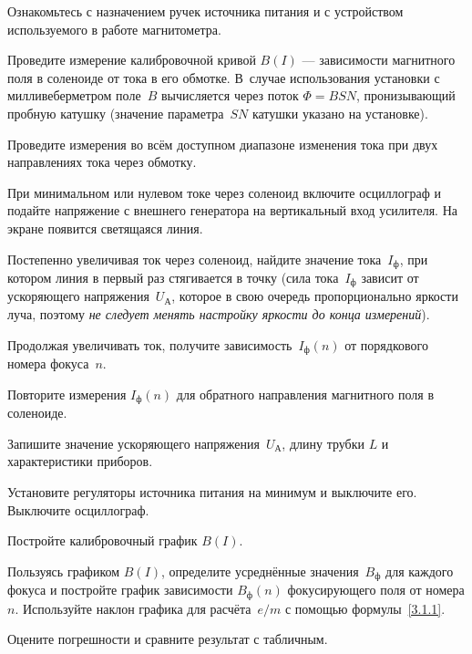 \begin{lab:task}

    
\item Ознакомьтесь с назначением ручек источника питания и с устройством 
    используемого в работе магнитометра. 
    
\item Проведите измерение калибровочной кривой $B(I)$ --- зависимости магнитного поля
в соленоиде от тока в его обмотке. В~случае использования установки с
милливеберметром поле~$B$ вычисляется через поток $\Phi=BSN$, пронизывающий пробную
катушку (значение параметра~$SN$ катушки указано на установке).

Проведите измерения во всём доступном диапазоне изменения тока при двух
направлениях тока через обмотку.

\item При минимальном или нулевом токе через соленоид включите осциллограф и
подайте напряжение с внешнего генератора на вертикальный 
вход усилителя. На экране появится светящаяся линия.


\item Постепенно увеличивая ток через соленоид, найдите значение тока~$I_ф$, при
котором линия в первый раз стягивается в точку 
(сила тока~$I_ф$ зависит от ускоряющего напряжения~$U_А$, 
которое в свою очередь пропорционально 
яркости луча, поэтому \emph{не следует менять настройку яркости до конца измерений}).

Продолжая увеличивать ток, получите зависимость~$I_ф(n)$ от порядкового номера
фокуса~$n$.

\item Повторите измерения $I_ф(n)$ для обратного направления магнитного поля
в соленоиде.

\item Запишите значение ускоряющего напряжения~$U_А$, длину трубки
$L$ и характеристики приборов.

\item Установите регуляторы источника питания на минимум и выключите его. 
Выключите осциллограф.


\item Постройте калибровочный график $B(I)$.

\item Пользуясь графиком $B(I)$, определите усреднённые значения~$B_ф$ для каждого
фокуса и постройте график зависимости $B_ф(n)$ фокусирующего поля от номера $n$. 
Используйте наклон графика для расчёта~$e/m$ с помощью формулы~\eqref{3.1.1}.

\item Оцените погрешности и сравните результат с табличным.

\end{lab:task}


